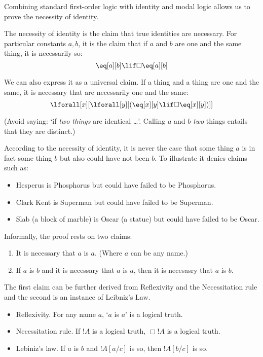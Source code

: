 \documentclass[../../../include/open-logic-section]{subfiles}
\begin{document}


Combining standard first-order logic with identity and modal logic 
allows us to prove the necessity of identity. 

\begin{defn}
The necessity of identity is the claim that true identities are 
necessary. For particular constants $a,b$, it is the claim that 
if $a$ and $b$ are one and the same thing, it is necessarily so:
$$\eq[a][b]\lif\Box\eq[a][b]$$ 

We can also express it as a universal claim. If a thing and a thing
are one and the same, it is necessary that  are necessarily one and
the same: 
$$\lforall[x][\lforall[y][(\eq[x][y]\lif\Box\eq[x][y])]]$$
\end{defn}

(Avoid saying: `if \emph{two things} are identical \dots'. Calling $a$
 and $b$ \emph{two} things entails that they are distinct.)

According to the necessity of identity, it is never the case that 
some thing $a$ is in fact some thing $b$ but also 
could have not been $b$. To illustrate it denies claims such as:
\begin{itemize}
\item Hesperus is Phosphorus but could have failed to be Phosphorus.
\item Clark Kent is Superman but could have failed to be Superman.
\item Slab (a block of marble) is Oscar (a statue) but could have 
failed to be Oscar. 
\end{itemize} 

Informally, the proof rests on two claims:
\begin{enumerate}
    \item It is necessary that $a$ is $a$. (Where $a$ can be any name.)
    \item If $a$ is $b$ and it is necessary that $a$ is $a$, then it 
    is necesasry that $a$ is $b$.
\end{enumerate}
The first claim can be further derived from Reflexivity and the
Necessitation rule and the second is an instance of Leibniz's Law.
\begin{itemize}
    \item Reflexivity. For any name $a$, `$a$ is $a$' is a logical truth.
    \item Necessitation rule. If $!A$ is a logical truth, $\Box!A$ is
    a logical truth.
    \item Lebiniz's law. If $a$ is $b$ and $!A[a/c]$ is so, then 
    $!A[b/c]$ is so.
\end{itemize}
\end{document}
